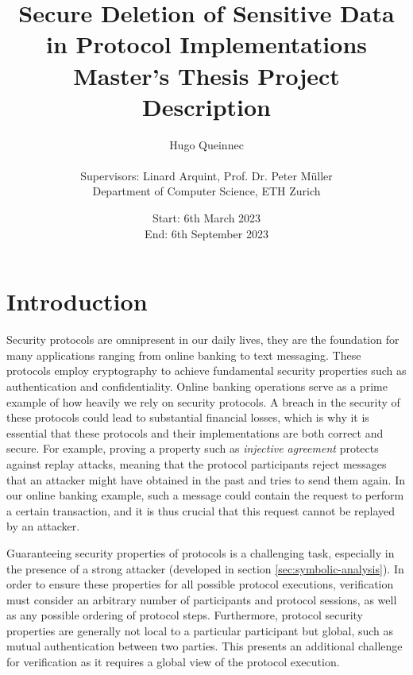 \documentclass{article}
\title{Secure Deletion of Sensitive Data in Protocol Implementations\\
{\large Master's Thesis Project Description}}
\author{Hugo Queinnec \\ \\ Supervisors: Linard Arquint, Prof. Dr. Peter Müller \\
Department of Computer Science, ETH Zurich}
\date{Start: 6th March 2023 \\
      End: 6th September 2023 \\
}
\begin{document}
\maketitle

\thispagestyle{plain}
\pagestyle{plain}


\section{Introduction}

Security protocols are omnipresent in our daily lives, they are the foundation for many applications ranging from online banking to text messaging. These protocols employ cryptography to achieve fundamental security properties such as authentication and confidentiality.
Online banking operations serve as a prime example of how heavily we rely on security protocols. A breach in the security of these protocols could lead to substantial financial losses, which is why it is essential that these protocols and their implementations are both correct and secure.
For example, proving a property such as \emph{injective agreement} protects against replay attacks, meaning that the protocol participants reject messages that an attacker might have obtained in the past and tries to send them again. In our online banking example, such a message could contain the request to perform a certain transaction, and it is thus crucial that this request cannot be replayed by an attacker.

Guaranteeing security properties of protocols is a challenging task, especially in the presence of a strong attacker (developed in section \ref*{sec:symbolic-analysis}). In order to ensure these properties for all possible protocol executions, verification must consider an arbitrary number of participants and protocol sessions, as well as any possible ordering of protocol steps. Furthermore, protocol security properties are generally not local to a particular participant but global, such as mutual authentication between two parties. This presents an additional challenge for verification as it requires a global view of the protocol execution.
\end{document}

